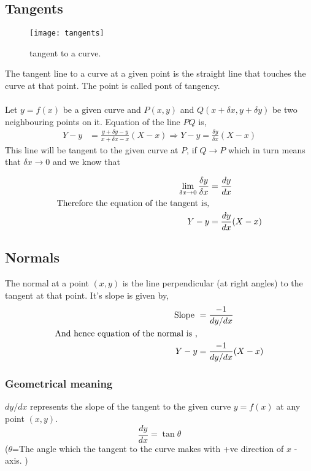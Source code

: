 \subsection{Tangents}
\begin{wrapfigure}{r}{0.25\textwidth}
	\begin{center}
		\texttt{[image: tangents]}
	\end{center}
	\caption{tangent to a curve.}
\end{wrapfigure}
The tangent line to a curve at a given point is the straight line  that touches the curve at that point. The point is called pont of tangency.\\\\
Let $y=f(x)$ be a given curve and $P(x, y)$ and $Q(x+\delta x, y+\delta y)$ be two
neighbouring points on it. Equation of the line $P Q$ is,
\begin{align}
Y-y&=\frac{y+\delta y-y}{x+\delta x-x}(X-x)
\Longrightarrow Y-y=\frac{\delta y}{\delta x}(X-x)
\end{align}
This line will be tangent to the given curve at $P$, if $Q \rightarrow P$ which in turn means that $\delta x \rightarrow 0$ and we know that 

\begin{align}
\lim _{\delta x \rightarrow 0} \frac{\delta y}{\delta x}&=\frac{d y}{d x}\\\text{Therefore the equation of the tangent is,}\notag\\
Y-y&=\frac{d y}{d x}(X-x)
\end{align} 
\subsection{Normals}
The normal at a point $(x, y)$  is the line perpendicular (at right angles) to the tangent at that point. It's slope is given by,
\begin{align}
\text{Slope  }&=\frac{-1}{{d y}/{d x}}\\
\text{And hence equation of the normal is ,}\notag\\
Y-y&=\frac{-1}{d y / d x}(X-x)
\end{align} 

\subsubsection{Geometrical meaning }
$d y / d x$ represents the slope of the tangent to the given curve $y=f(x)$ at any point $(x, y).$
$$ \frac{d y}{d x}=\tan \theta$$($\theta$={The angle which the tangent to the curve makes with +ve direction of $x$ -axis.} )
